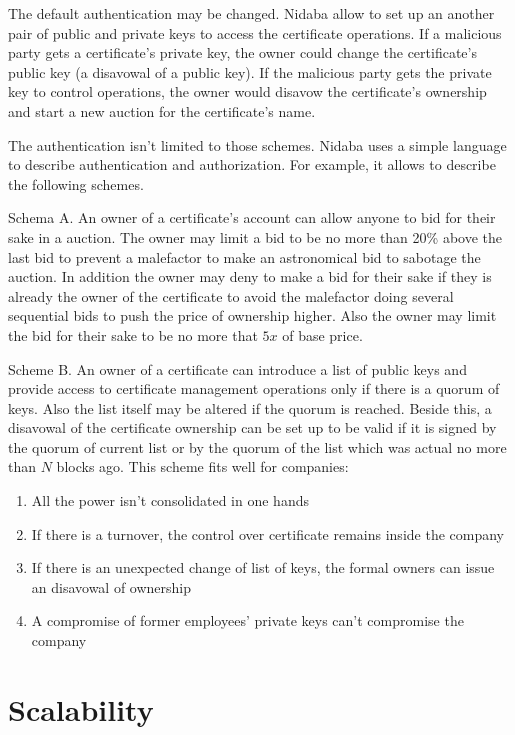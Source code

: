 \documentclass[12pt]{article}
\begin{document}
The default authentication may be changed. Nidaba allow to set up an another pair of public and private keys to access the certificate operations. If a malicious party gets a certificate's private key, the owner could change the certificate's public key (a disavowal of a public key). If the malicious party gets the private key to control operations, the owner would disavow the certificate's ownership and start a new auction for the certificate's name.

The authentication isn't limited to those schemes. Nidaba uses a simple language to describe authentication and authorization. For example, it allows to describe the following schemes.

Schema A. An owner of a certificate's account can allow anyone to bid for their sake in a auction. The owner may limit a bid to be no more than 20\% above the last bid to prevent a malefactor to make an astronomical bid to sabotage the auction. In addition the owner may deny to make a bid for their sake if they is already the owner of the certificate to avoid the malefactor doing several sequential bids to push the price of ownership higher. Also the owner may limit the bid for their sake to be no more that $5x$ of base price.

Scheme B. An owner of a certificate can introduce a list of public keys and provide access to certificate management operations only if there is a quorum of keys. Also the list itself may be altered if the quorum is reached. Beside this, a disavowal of the certificate ownership can be set up to be valid if it is signed by the quorum of current list or by the quorum of the list which was actual no more than $N$ blocks ago. This scheme fits well for companies:
\begin{enumerate}
  \item All the power isn't consolidated in one hands
  \item If there is a turnover, the control over certificate remains inside the company
  \item If there is an unexpected change of list of keys, the formal owners can issue an disavowal of ownership
  \item A compromise of former employees' private keys can't compromise the company
\end{enumerate}

\section{Scalability}
\end{document}
